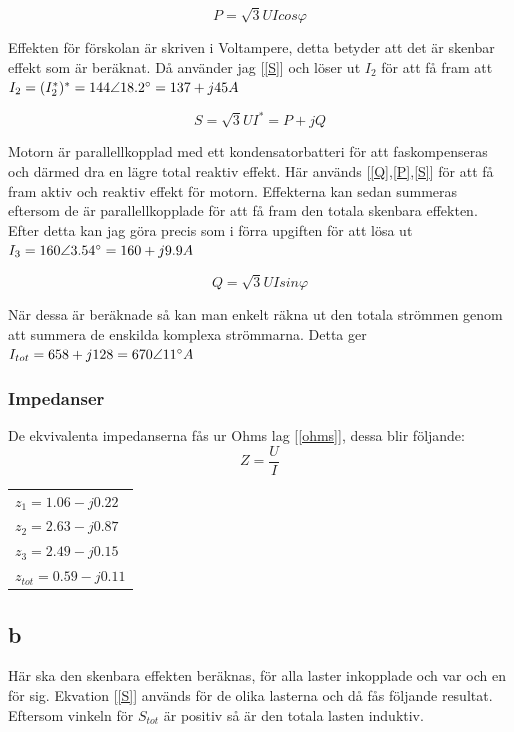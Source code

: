\documentclass{article}
\begin{document}
  \begin{equation}
    P=\sqrt3UIcos\varphi
    \label{P}
  \end{equation}

  Effekten för förskolan är skriven i Voltampere, detta betyder att det är skenbar effekt som är beräknat.
  Då använder jag [\ref{S}] och löser ut $I_2$ för att få fram att $I_2=(I_2^*)^*=144\angle{18.2\degree}=137+j45 A$

  \begin{equation}
    S=\sqrt3UI^*=P+jQ
    \label{S}
  \end{equation}

  Motorn är parallellkopplad med ett kondensatorbatteri för att faskompenseras och därmed dra en lägre total reaktiv effekt.
  Här används [\ref{Q},\ref{P},\ref{S}] för att få fram aktiv och reaktiv effekt för motorn.
  Effekterna kan sedan summeras eftersom de är parallellkopplade för att få fram den totala skenbara effekten.
  Efter detta kan jag göra precis som i förra upgiften för att lösa ut $I_3=160\angle{3.54\degree}=160+j9.9 A$

  \begin{equation}
    Q=\sqrt3UIsin\varphi
    \label{Q}
  \end{equation}

  När dessa är beräknade så kan man enkelt räkna ut den totala strömmen genom att summera de enskilda komplexa strömmarna.
  Detta ger $I_{tot}=658+j128 = 670\angle{11\degree} A$

  \subsubsection{Impedanser}
  De ekvivalenta impedanserna fås ur Ohms lag [\ref{ohms}], dessa blir följande:
  \begin{equation}
    Z=\frac{U}{I}
    \label{ohms}
  \end{equation}

  \begin{tabular}{l}
    $z_1=1.06-j0.22$\\
    $z_2=2.63-j0.87$\\
    $z_3=2.49-j0.15$\\
    $z_{tot}=0.59-j0.11$\\
  \end{tabular}

\subsection{b}
  Här ska den skenbara effekten beräknas, för alla laster inkopplade och var och en för sig.
  Ekvation [\ref{S}] används för de olika lasterna och då fås följande resultat.
  Eftersom vinkeln för $S_{tot}$ är positiv så är den totala lasten induktiv.
\end{document}
